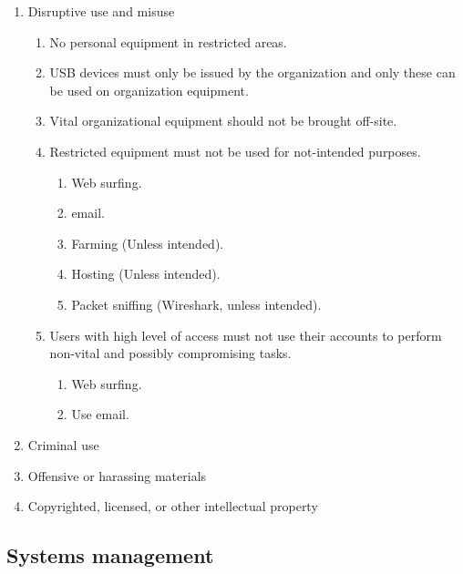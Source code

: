 \begin{enumerate}
  \item Disruptive use and misuse
  \begin{enumerate}
    \item No personal equipment in restricted areas.
    \item USB devices must only be issued by the organization and only these can be used on organization equipment.
    \item Vital organizational equipment should not be brought off-site.
    \item Restricted equipment must not be used for not-intended purposes.
    \begin{enumerate}
      \item Web surfing.
      \item email.
      \item Farming (Unless intended).
      \item Hosting (Unless intended).
      \item Packet sniffing (Wireshark, unless intended).
    \end{enumerate}
    \item Users with high level of access must not use their accounts to perform non-vital and possibly compromising tasks.
    \begin{enumerate}
        \item Web surfing.
        \item Use email.
    \end{enumerate}
  \end{enumerate}
  \item Criminal use %
  \item Offensive or harassing materials
  \item Copyrighted, licensed, or other intellectual property %
\end{enumerate}

\subsection{Systems management}

